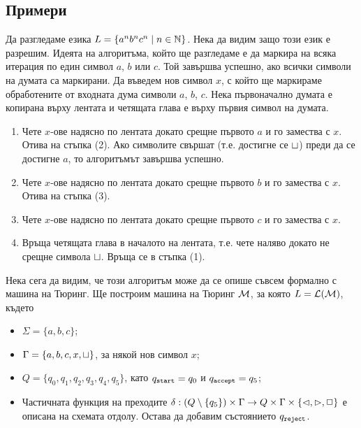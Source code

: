 \subsection*{Примери}
\label{sect:turing:examples}

\begin{extra}
\begin{example}
  Да разгледаме езика $L = \{a^nb^nc^n \mid n\in\mathbb{N}\}$.
  Нека да видим защо този език е разрешим.
  Идеята на алгоритъма, който ще разгледаме е да маркира на всяка итерация по един символ $a$, $b$ или $c$.
  Той завършва успешно, ако всички символи на думата са маркирани.
  Да въведем нов символ $x$, с който ще маркираме обработените от входната дума символи $a$, $b$, $c$.
  Нека първоначално думата е копирана върху лентата и четящата глава е върху първия символ на думата.
  \begin{enumerate}[(1)]
  \item 
    Чете $x$-ове надясно по лентата докато срещне първото $a$ и го замества с $x$. Отива на стъпка (2).
    Ако символите свършат (т.е. достигне се $\sqcup$) преди да се достигне $a$,
    то алгоритъмът завършва успешно.
  \item
    Чете $x$-ове надясно по лентата докато срещне първото $b$ и го замества с $x$.
    Отива на стъпка (3).
  \item
    Чете $x$-ове надясно по лентата докато срещне първото $c$ и го замества с $x$.
  \item
    Връща четящата глава в началото на лентата, т.е. чете наляво докато не срещне символа $\sqcup$.
    Връща се в стъпка (1). 
  \end{enumerate}

  Нека сега да видим, че този алгоритъм може да се опише съвсем формално с машина на Тюринг.
  Ще построим машина на Тюринг $\mathcal{M}$, за която $L = \mathcal{L}(\mathcal{M})$, където
  \begin{itemize}
  \item 
    $\Sigma = \{a,b,c\}$;
  \item
    $\Gamma = \{a,b,c,x,\sqcup\}$, за някой нов символ $x$;
  \item
    $Q = \{q_0,q_1,q_2,q_3,q_4,q_5\}$, като $q_{\texttt{start}} = q_0$ и $q_{\texttt{accept}} = q_5$;
  \item
    Частичната функция на преходите $\delta:(Q\setminus\{q_5\})\times\Gamma \to Q\times\Gamma\times\{\lhd,\rhd,\Box\}$
    е описана на схемата отдолу. Остава да добавим състоянието $q_{\texttt{reject}}$.
  \end{itemize}


\end{example}
\end{extra}
